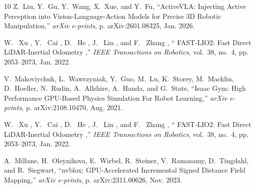 \documentclass[letterpaper, 10 pt, conference]{ieeeconf/ieeeconf}
\providecommand{\DIFadd}[1]{{\protect\color{blue} \sf #1}} %
\providecommand{\DIFdel}[1]{{\protect\color{red} \scriptsize #1}} %
\providecommand{\DIFaddbegin}{} %
\providecommand{\DIFaddend}{} %
\providecommand{\DIFdelbegin}{} %
\providecommand{\DIFdelend}{} %
\begin{document}
\begin{thebibliography}{10}
Z.~{Liu}, Y.~{Gu}, Y.~{Wang}, X.~{Xue}, and Y.~{Fu}, ``{ActiveVLA: Injecting
  Active Perception into Vision-Language-Action Models for Precise 3D Robotic
  Manipulation},'' \emph{arXiv e-prints}, p. arXiv:2601.08325, Jan. 2026.

\DIFdelbegin {}
\DIFdel{W.~}%
\DIFdel{Xu}%
\DIFdel{, Y.~}%
\DIFdel{Cai}%
\DIFdel{, D.~}%
\DIFdel{He}%
\DIFdel{, J.~}%
\DIFdel{Lin}%
\DIFdel{, and F.~}%
\DIFdel{Zhang}%
\DIFdel{, ``}%
\DIFdel{FAST-LIO2: Fast Direct
  LiDAR-Inertial Odometry}%
\DIFdel{,'' \emph{IEEE Transactions on Robotics}, vol.~38,
  no.~4, pp. 2053--2073, Jan. 2022.
}%

\DIFdelend {}
V.~{Makoviychuk}, L.~{Wawrzyniak}, Y.~{Guo}, M.~{Lu}, K.~{Storey},
  M.~{Macklin}, D.~{Hoeller}, N.~{Rudin}, A.~{Allshire}, A.~{Handa}, and
  G.~{State}, ``{Isaac Gym: High Performance GPU-Based Physics Simulation For
  Robot Learning},'' \emph{arXiv e-prints}, p. arXiv:2108.10470, Aug. 2021.
\DIFaddbegin 

\DIFadd{W.~}{\DIFadd{Xu}}\DIFadd{, Y.~}{\DIFadd{Cai}}\DIFadd{, D.~}{\DIFadd{He}}\DIFadd{, J.~}{\DIFadd{Lin}}\DIFadd{, and F.~}{\DIFadd{Zhang}}\DIFadd{, ``}{\DIFadd{FAST-LIO2: Fast Direct
  LiDAR-Inertial Odometry}}\DIFadd{,'' \emph{IEEE Transactions on Robotics}, vol.~38,
  no.~4, pp. 2053--2073, Jan. 2022.
}\DIFaddend 

A.~{Millane}, H.~{Oleynikova}, E.~{Wirbel}, R.~{Steiner}, V.~{Ramasamy},
  D.~{Tingdahl}, and R.~{Siegwart}, ``{nvblox: GPU-Accelerated Incremental
  Signed Distance Field Mapping},'' \emph{arXiv e-prints}, p. arXiv:2311.00626,
  Nov. 2023.

\end{thebibliography}


% 
\end{document}
